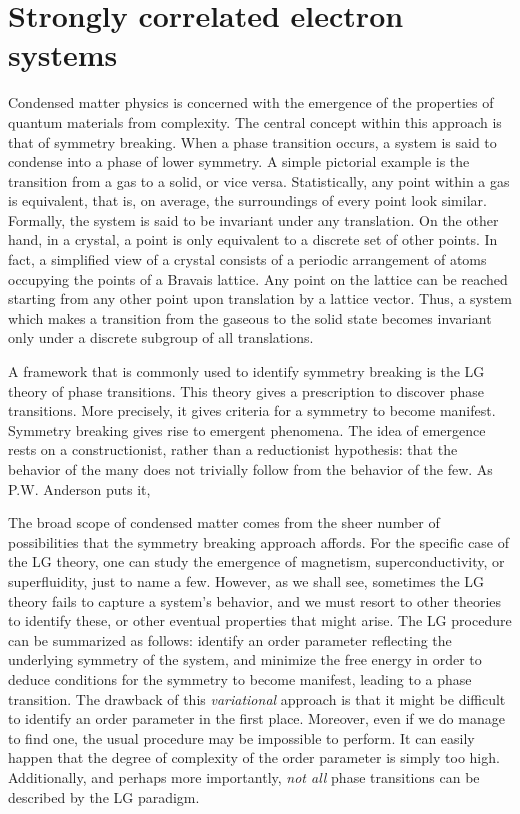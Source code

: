 \section{Strongly correlated electron systems}
\label{sec:strongly_correlated}

Condensed matter physics is concerned with the emergence of the properties of quantum materials from complexity.
The central concept within this approach is that of symmetry breaking.
When a phase transition occurs, a system is said to condense into a phase of lower symmetry.
A simple pictorial example is the transition from a gas to a solid, or vice versa.
Statistically, any point within a gas is equivalent, that is, on average, the surroundings of every point look similar.
Formally, the system is said to be invariant under any translation.
On the other hand, in a crystal, a point is only equivalent to a discrete set of other points.
In fact, a simplified view of a crystal consists of a periodic arrangement of atoms occupying the points of a Bravais lattice.
Any point on the lattice can be reached starting from any other point upon translation by a lattice vector.
Thus, a system which makes a transition from the gaseous to the solid state becomes invariant only under a discrete subgroup of all translations. 

A framework that is commonly used to identify symmetry breaking is the \ac{LG} theory of phase transitions.
This theory gives a prescription to discover phase transitions.
More precisely, it gives criteria for a symmetry to become manifest.
Symmetry breaking gives rise to emergent phenomena.
The idea of emergence rests on a constructionist, rather than a reductionist hypothesis: that the behavior of the many does not trivially follow from the behavior of the few.
As P.W. Anderson puts it,  \cite{anderson_more_1972}

The broad scope of condensed matter comes from the sheer number of possibilities that the symmetry breaking approach affords.
For the specific case of the \acs{LG} theory, one can study the emergence of magnetism, superconductivity, or superfluidity, just to name a few.
However, as we shall see, sometimes the \acs{LG} theory fails to capture a system's behavior, and we must resort to other theories to identify these, or other eventual properties that might arise.
The \acl{LG} procedure can be summarized as follows: identify an order parameter reflecting the underlying symmetry of the system, and minimize the free energy in order to deduce conditions for the symmetry to become manifest, leading to a phase transition.
The drawback of this \emph{variational} approach is that it might be difficult to identify an order parameter in the first place.
Moreover, even if we do manage to find one, the usual procedure may be impossible to perform.
It can easily happen that the degree of complexity of the order parameter is simply too high.
Additionally, and perhaps more importantly, \emph{not all} phase transitions can be described by the LG paradigm.

